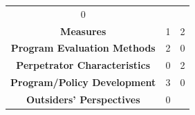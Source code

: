 \documentclass[]{tufte-handout}
\begin{document}
\begin{longtable}[]{@{}cll@{}}
\begin{minipage}[t]{0.22\columnwidth}
0\strut
\end{minipage}\tabularnewline
\begin{minipage}[t]{0.47\columnwidth}\centering\strut
\textbf{Measures}\strut
\end{minipage} & \begin{minipage}[t]{0.22\columnwidth}\raggedright\strut
1\strut
\end{minipage} & \begin{minipage}[t]{0.22\columnwidth}\raggedright\strut
2\strut
\end{minipage}\tabularnewline
\begin{minipage}[t]{0.47\columnwidth}\centering\strut
\textbf{Program Evaluation Methods}\strut
\end{minipage} & \begin{minipage}[t]{0.22\columnwidth}\raggedright\strut
2\strut
\end{minipage} & \begin{minipage}[t]{0.22\columnwidth}\raggedright\strut
0\strut
\end{minipage}\tabularnewline
\begin{minipage}[t]{0.47\columnwidth}\centering\strut
\textbf{Perpetrator Characteristics}\strut
\end{minipage} & \begin{minipage}[t]{0.22\columnwidth}\raggedright\strut
0\strut
\end{minipage} & \begin{minipage}[t]{0.22\columnwidth}\raggedright\strut
2\strut
\end{minipage}\tabularnewline
\begin{minipage}[t]{0.47\columnwidth}\centering\strut
\textbf{Program/Policy Development}\strut
\end{minipage} & \begin{minipage}[t]{0.22\columnwidth}\raggedright\strut
3\strut
\end{minipage} & \begin{minipage}[t]{0.22\columnwidth}\raggedright\strut
0\strut
\end{minipage}\tabularnewline
\begin{minipage}[t]{0.47\columnwidth}\centering\strut
\textbf{Outsiders' Perspectives}\strut
\end{minipage} & \begin{minipage}[t]{0.22\columnwidth}\raggedright\strut
0\strut
\end{minipage} & \begin{minipage}[t]{0.22\columnwidth}\raggedright\strut

\end{minipage}
\end{longtable}
\end{document}
